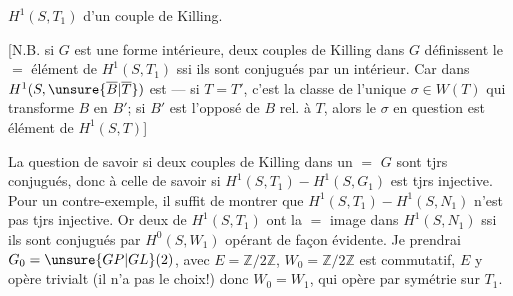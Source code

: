 $H^1(S,T_1)$  d'un couple de Killing.

[N.B. si $G$ est une forme intérieure,  deux couples de Killing  dans $G$ définissent le $=$ élément de $H^1(S,T_1)$ ssi ils sont conjugués par un  intérieur. Car   dans $H^1(S,\unsure{\overline B|\overline T})$ est  --- si $T=T'$, c'est la classe  de l'unique $\sigma\in W(T)$ qui transforme $B$ en $B'$; si $B'$ est l'opposé de $B$ rel. à $T$, alors le $\sigma$ en question est     élément  de $H^1(S,T)$]


La question de savoir si deux couples de Killing dans un $=$ $G$ sont tjrs conjugués,  donc à celle de savoir si $H^1(S,T_1)\mathbin{-}H^1(S,G_1)$ est tjrs injective. Pour un contre-exemple, il suffit de montrer que $H^1(S,T_1)\mathbin{-}H^1(S,N_1)$ n'est pas tjrs injective. Or deux  de $H^1(S,T_1)$ ont la $=$ image dans $H^1(S,N_1)$ ssi ils sont conjugués par $H^0(S,W_1)$ opérant de façon évidente. Je prendrai  $G_0=\unsure{GP|GL}(2)$, avec $E=\mathbb Z/2\mathbb Z$, $W_0=\mathbb Z/2\mathbb Z$ est commutatif,  $E$ y opère trivialt (il n'a pas le choix!) donc $W_0=W_1$, qui opère par symétrie sur $T_1$.

